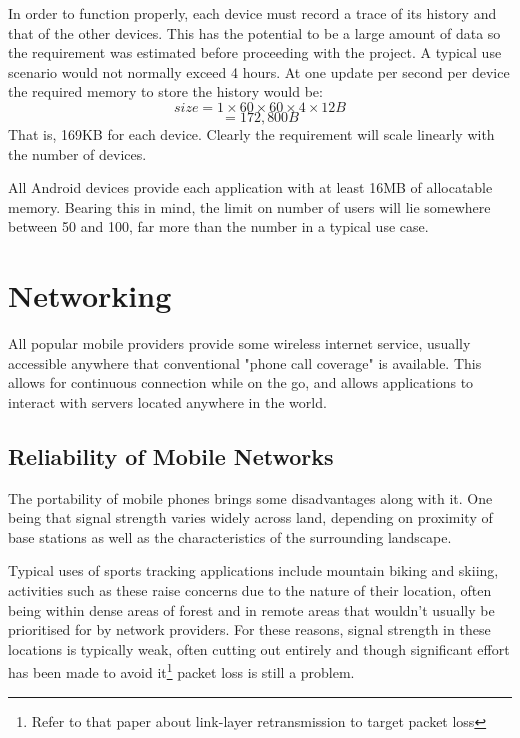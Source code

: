 In order to function properly, each device must record a trace of its history and that of the other devices. This has the potential to be a large amount of data so the requirement was estimated before proceeding with the project.
A typical use scenario would not normally exceed 4 hours.
At one update per second per device the required memory to store the history would be:
\begin{equation}
size = 1\times60\times60\times4\times12B
\end{equation}
\begin{equation*}
= 172,800B
\end{equation*}
That is, 169KB for each device. Clearly the requirement will scale linearly with the number of devices.

All Android devices provide each application with at least 16MB of allocatable memory. Bearing this in mind, the limit on number of users will lie somewhere between 50 and 100, far more than the number in a typical use case.

\section{Networking}

All popular mobile providers provide some wireless internet service, usually accessible anywhere that conventional "phone call coverage" is available. This allows for continuous connection while on the go, and allows applications to interact with servers located anywhere in the world.

\subsection{Reliability of Mobile Networks}

The portability of mobile phones brings some disadvantages along with it. One being that signal strength varies widely across land, depending on proximity of base stations as well as the characteristics of the surrounding landscape.

Typical uses of sports tracking applications include mountain biking and skiing, activities such as these raise concerns due to the nature of their location, often being within dense areas of forest and in remote areas that wouldn't usually be prioritised for by network providers. For these reasons, signal strength in these locations is typically weak, often cutting out entirely and though significant effort has been made to avoid it\footnote{Refer to that paper about link-layer retransmission to target packet loss} packet loss is still a problem.

